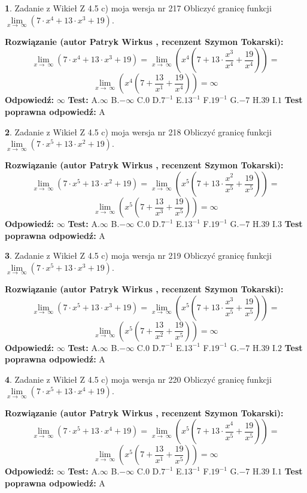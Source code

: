 \documentclass[12pt, a4paper]{article}
\theoremstyle{definition} %
\newtheorem{zad}{}
\newcommand{\zadStart}[1]{\begin{zad}#1\newline}
\newcommand{\zadStop}{\end{zad}}
\newcommand{\rozwStart}[2]{\noindent \textbf{Rozwiązanie (autor #1 , recenzent #2): }\newline}
\newcommand{\rozwStop}{\newline}
\newcommand{\odpStart}{\noindent \textbf{Odpowiedź:}\newline}
\newcommand{\odpStop}{\newline}
\newcommand{\testStart}{\noindent \textbf{Test:}\newline}
\newcommand{\testStop}{\newline}
\newcommand{\kluczStart}{\noindent \textbf{Test poprawna odpowiedź:}\newline}
\newcommand{\kluczStop}{\newline}
\begin{document}
\zadStart{Zadanie z Wikieł Z 4.5 c) moja wersja nr 217}
Obliczyć granicę funkcji  $\lim\limits_{x\to\ \infty}(7 \cdot x^{4}+13 \cdot x^{3}+19)$.
\zadStop
\rozwStart{Patryk Wirkus}{Szymon Tokarski}
$$\lim\limits_{x\to\ \infty}(7 \cdot x^{4}+13 \cdot x^{3}+19) = \lim\limits_{x\to\ \infty}(x^{4}(7 +13 \cdot \frac{x^{3}}{x^{4}}+\frac{19}{x^{4}})) =$$ $$\lim\limits_{x\to\ \infty}(x^{4}(7 +\frac{13}{x^{1}}+\frac{19}{x^{4}})) =\infty$$
\rozwStop
\odpStart
$\infty$
\odpStop
\testStart
A.$\infty$ B.$-\infty$ C.$0$ D.$7^{-1}$ E.$13^{-1}$
F.$19^{-1}$ G.$-7$
H.$39$
I.$1$
\testStop
\kluczStart
A
\kluczStop



\zadStart{Zadanie z Wikieł Z 4.5 c) moja wersja nr 218}
Obliczyć granicę funkcji  $\lim\limits_{x\to\ \infty}(7 \cdot x^{5}+13 \cdot x^{2}+19)$.
\zadStop
\rozwStart{Patryk Wirkus}{Szymon Tokarski}
$$\lim\limits_{x\to\ \infty}(7 \cdot x^{5}+13 \cdot x^{2}+19) = \lim\limits_{x\to\ \infty}(x^{5}(7 +13 \cdot \frac{x^{2}}{x^{5}}+\frac{19}{x^{5}})) =$$ $$\lim\limits_{x\to\ \infty}(x^{5}(7 +\frac{13}{x^{3}}+\frac{19}{x^{5}})) =\infty$$
\rozwStop
\odpStart
$\infty$
\odpStop
\testStart
A.$\infty$ B.$-\infty$ C.$0$ D.$7^{-1}$ E.$13^{-1}$
F.$19^{-1}$ G.$-7$
H.$39$
I.$3$
\testStop
\kluczStart
A
\kluczStop



\zadStart{Zadanie z Wikieł Z 4.5 c) moja wersja nr 219}
Obliczyć granicę funkcji  $\lim\limits_{x\to\ \infty}(7 \cdot x^{5}+13 \cdot x^{3}+19)$.
\zadStop
\rozwStart{Patryk Wirkus}{Szymon Tokarski}
$$\lim\limits_{x\to\ \infty}(7 \cdot x^{5}+13 \cdot x^{3}+19) = \lim\limits_{x\to\ \infty}(x^{5}(7 +13 \cdot \frac{x^{3}}{x^{5}}+\frac{19}{x^{5}})) =$$ $$\lim\limits_{x\to\ \infty}(x^{5}(7 +\frac{13}{x^{2}}+\frac{19}{x^{5}})) =\infty$$
\rozwStop
\odpStart
$\infty$
\odpStop
\testStart
A.$\infty$ B.$-\infty$ C.$0$ D.$7^{-1}$ E.$13^{-1}$
F.$19^{-1}$ G.$-7$
H.$39$
I.$2$
\testStop
\kluczStart
A
\kluczStop



\zadStart{Zadanie z Wikieł Z 4.5 c) moja wersja nr 220}
Obliczyć granicę funkcji  $\lim\limits_{x\to\ \infty}(7 \cdot x^{5}+13 \cdot x^{4}+19)$.
\zadStop
\rozwStart{Patryk Wirkus}{Szymon Tokarski}
$$\lim\limits_{x\to\ \infty}(7 \cdot x^{5}+13 \cdot x^{4}+19) = \lim\limits_{x\to\ \infty}(x^{5}(7 +13 \cdot \frac{x^{4}}{x^{5}}+\frac{19}{x^{5}})) =$$ $$\lim\limits_{x\to\ \infty}(x^{5}(7 +\frac{13}{x^{1}}+\frac{19}{x^{5}})) =\infty$$
\rozwStop
\odpStart
$\infty$
\odpStop
\testStart
A.$\infty$ B.$-\infty$ C.$0$ D.$7^{-1}$ E.$13^{-1}$
F.$19^{-1}$ G.$-7$
H.$39$
I.$1$
\testStop
\kluczStart
A
\kluczStop
\end{document}
